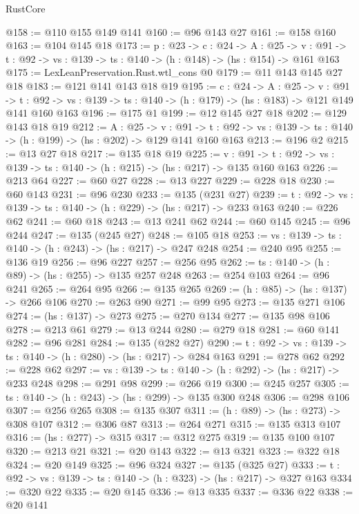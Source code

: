\begin{lexlean}{RustCore}
\begin{coremodule}
@158 := @110 @155 @149 @141
@160 := @96 @143 @27
@161 := @158 @160
@163 := @104 @145 @18
@173 := {p : @23} ->
  {c : @24} ->
  {A : @25} ->
  {v : @91} -> {t : @92} -> {vs : @139} -> {ts : @140} -> (h : @148) -> (hs : @154) -> @161 @163
@175 := LexLeanPreservation.Rust.wtl_cons @0
@179 := @11 @143 @145 @27 @18
@183 := @121 @141 @143 @18 @19
@195 := {c : @24} ->
  {A : @25} ->
  {v : @91} ->
  {t : @92} -> {vs : @139} -> {ts : @140} -> (h : @179) -> (hs : @183) -> @121 @149 @141 @160 @163
@196 := @175 @1
@199 := @12 @145 @27 @18
@202 := @129 @143 @18 @19
@212 := {A : @25} ->
  {v : @91} ->
  {t : @92} -> {vs : @139} -> {ts : @140} -> (h : @199) -> (hs : @202) -> @129 @141 @160 @163
@213 := @196 @2
@215 := @13 @27 @18
@217 := @135 @18 @19
@225 := {v : @91} ->
  {t : @92} -> {vs : @139} -> {ts : @140} -> (h : @215) -> (hs : @217) -> @135 @160 @163
@226 := @213 @64
@227 := @60 @27
@228 := @13 @227
@229 := @228 @18
@230 := @60 @143
@231 := @96 @230
@233 := @135 (@231 @27)
@239 := {t : @92} -> {vs : @139} -> {ts : @140} -> (h : @229) -> (hs : @217) -> @233 @163
@240 := @226 @62
@241 := @60 @18
@243 := @13 @241 @62
@244 := @60 @145
@245 := @96 @244
@247 := @135 (@245 @27)
@248 := @105 @18
@253 := {vs : @139} -> {ts : @140} -> (h : @243) -> (hs : @217) -> @247 @248
@254 := @240 @95
@255 := @136 @19
@256 := @96 @227
@257 := @256 @95
@262 := {ts : @140} -> (h : @89) -> (hs : @255) -> @135 @257 @248
@263 := @254 @103
@264 := @96 @241
@265 := @264 @95
@266 := @135 @265
@269 := (h : @85) -> (hs : @137) -> @266 @106
@270 := @263 @90
@271 := @99 @95
@273 := @135 @271 @106
@274 := (hs : @137) -> @273
@275 := @270 @134
@277 := @135 @98 @106
@278 := @213 @61
@279 := @13 @244
@280 := @279 @18
@281 := @60 @141
@282 := @96 @281
@284 := @135 (@282 @27)
@290 := {t : @92} -> {vs : @139} -> {ts : @140} -> (h : @280) -> (hs : @217) -> @284 @163
@291 := @278 @62
@292 := @228 @62
@297 := {vs : @139} -> {ts : @140} -> (h : @292) -> (hs : @217) -> @233 @248
@298 := @291 @98
@299 := @266 @19
@300 := @245 @257
@305 := {ts : @140} -> (h : @243) -> (hs : @299) -> @135 @300 @248
@306 := @298 @106
@307 := @256 @265
@308 := @135 @307
@311 := (h : @89) -> (hs : @273) -> @308 @107
@312 := @306 @87
@313 := @264 @271
@315 := @135 @313 @107
@316 := (hs : @277) -> @315
@317 := @312 @275
@319 := @135 @100 @107
@320 := @213 @21
@321 := @20 @143
@322 := @13 @321
@323 := @322 @18
@324 := @20 @149
@325 := @96 @324
@327 := @135 (@325 @27)
@333 := {t : @92} -> {vs : @139} -> {ts : @140} -> (h : @323) -> (hs : @217) -> @327 @163
@334 := @320 @22
@335 := @20 @145
@336 := @13 @335
@337 := @336 @22
@338 := @20 @141

\end{coremodule}
\end{lexlean}
